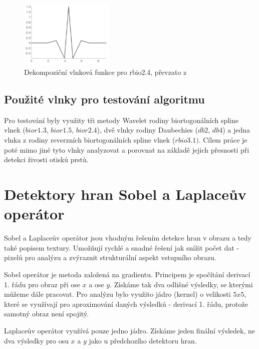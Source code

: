 \begin{figure}[!htbp]
    \centering
    \includegraphics[width=170px]{obrazky-figures/rbio31wavelet.PNG}
    \caption{Dekompoziční vlnková funkce pro rbio2.4, převzato z \cite{PyWaveletsBrowser}}
\end{figure}

\subsection{Použité vlnky pro testování algoritmu}
Pro testování byly využity tři metody Wavelet rodiny biortogonálních spline vlnek ($bior1.3$, $bior1.5$, $bior2.4$), dvě vlnky rodiny Daubechies ($db2$, $db4$) a jedna vlnka z rodiny reverzních biortogonálních spline vlnek ($rbio3.1)$. Cílem práce je poté mimo jiné tyto vlnky analyzovat a porovnat na základě jejich přesnosti při detekci živosti otisků prstů.

\section{Detektory hran Sobel a Laplaceův operátor}
Sobel a Laplaceův operátor jsou vhodným řešením detekce hran v obrazu a tedy také popisem textury. Umožňují rychlé a snadné řešení jak snížit počet dat - pixelů pro analýzu a zvýraznit strukturální aspekt vstupního obrazu. 

Sobel operátor je metoda založená na gradientu. Principem je spočítání derivací 1. řádu pro obraz při ose $x$ a ose $y$. Získáme tak dva odlišné výsledky, se kterými můžeme dále pracovat. Pro analýzu bylo využito jádro (kernel) o velikosti $5x5$, které se využívají pro aproximování daných výsledků - derivací 1. řádu, protože samotný obraz není spojitý. 

Laplaceův operátor využívá pouze jedno jádro. Získáme jeden finální výsledek, ne dva výsledky pro osu $x$ a $y$ jako u předchozího detektoru hran.\cite{SobelLaplacianDetectors}

